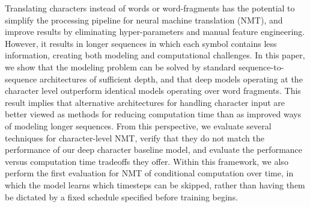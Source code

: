 Translating characters instead of words or word-fragments has the potential to simplify the processing pipeline for neural machine translation (NMT), and improve results by eliminating hyper-parameters and manual feature engineering. However, it results in longer sequences in which each symbol contains less information, creating both modeling and computational challenges. In this paper, we show that the modeling problem can be solved by standard sequence-to-sequence architectures of sufficient depth, and that deep models operating at the character level outperform identical models operating over word fragments. This result implies that alternative architectures for handling character input are better viewed as methods for reducing computation time than as improved ways of modeling longer sequences. From this perspective, we evaluate several techniques for character-level NMT, verify that they do not match the performance of our deep character baseline model, and evaluate the performance versus computation time tradeoffs they offer. Within this framework, we also perform the first evaluation for NMT of conditional computation over time, in which the model learns which timesteps can be skipped, rather than having them be dictated by a fixed schedule specified before training begins.
